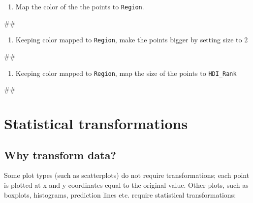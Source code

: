 \documentclass[]{book}
\newenvironment{Shaded}{\begin{snugshade}}{\end{snugshade}}
\newcommand{\NormalTok}[1]{#1}
\providecommand{\tightlist}{%
  \setlength{\itemsep}{0pt}\setlength{\parskip}{0pt}}
\begin{document}
\begin{enumerate}
\def\labelenumi{\arabic{enumi}.}
\setcounter{enumi}{2}
\tightlist
\item
  Map the color of the the points to \texttt{Region}.
\end{enumerate}

\begin{Shaded}
\begin{Highlighting}[]
\NormalTok{## }
\end{Highlighting}
\end{Shaded}

\begin{enumerate}
\def\labelenumi{\arabic{enumi}.}
\setcounter{enumi}{3}
\tightlist
\item
  Keeping color mapped to \texttt{Region}, make the points bigger by
  setting size to 2
\end{enumerate}

\begin{Shaded}
\begin{Highlighting}[]
\NormalTok{## }
\end{Highlighting}
\end{Shaded}

\begin{enumerate}
\def\labelenumi{\arabic{enumi}.}
\setcounter{enumi}{4}
\tightlist
\item
  Keeping color mapped to \texttt{Region}, map the size of the points to
  \texttt{HDI\_Rank}
\end{enumerate}

\begin{Shaded}
\begin{Highlighting}[]
\NormalTok{## }
\end{Highlighting}
\end{Shaded}

\section{Statistical transformations}\label{statistical-transformations}

\subsection{Why transform data?}\label{why-transform-data}

Some plot types (such as scatterplots) do not require transformations;
each point is plotted at x and y coordinates equal to the original
value. Other plots, such as boxplots, histograms, prediction lines etc.
require statistical transformations:
\end{document}
